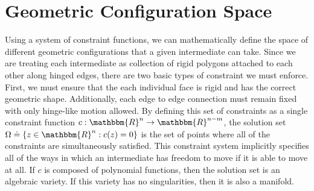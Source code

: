 
%
%



\section{Geometric Configuration Space}
%



Using a system of constraint functions, we can mathematically define the space of different geometric configurations that a given intermediate can take. Since we are treating each intermediate as collection of rigid polygons attached to each other along hinged edges, there are two basic types of constraint we must enforce. First, we must ensure that the each individual face is rigid and has the correct geometric shape. Additionally, each edge to edge connection must remain fixed with only hinge-like motion allowed. By defining this set of constraints as a single constraint function $c: \mathbbm{R}^n \to \mathbbm{R}^{n-m}$, the solution set $\Omega \doteq \{z \in \mathbbm{R}^n : c(z) = 0\}$ is the set of points where all of the constraints are simultaneously satisfied. This constraint system implicitly specifies all of the ways in which an intermediate has freedom to move if it is able to move at all. If $c$ is composed of polynomial functions, then the solution set is an algebraic variety. If this variety has no singularities, then it is also a manifold. 


